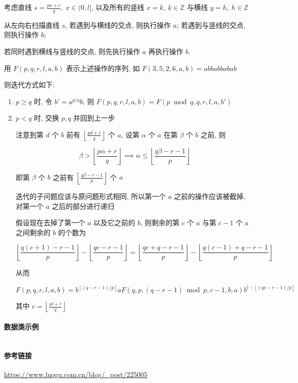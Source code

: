 考虑直线 \(s=\frac{px+r}{q},~x\in (0,l]\), 以及所有的竖线 \(x=k,~k\in\mathbb{Z}\) 与横线 \(y=h,~h\in\mathbb{Z}\)

从左向右扫描直线 \(s\), 若遇到与横线的交点, 则执行操作 \(a\); 若遇到与竖线的交点, 则执行操作 \(b\);

若同时遇到横线与竖线的交点, 则先执行操作 \(a\) 再执行操作 \(b\).

用 \(F(p,q,r,l,a,b)\) 表示上述操作的序列, 如 \(F(3,5,2,6,a,b)=abbabbabab\)

则迭代方式如下:

\begin{enumerate}
    \item \(p\geq q\) 时, 令 \(b'=a^{p/q}b\), 则 \(F(p,q,r,l,a,b)=F(p\bmod q,q,r,l,a,b')\)
    \item \(p<q\) 时, 交换 \(p,q\) 并回到上一步
          
          注意到第 \(d\) 个 \(b\) 前有 \(\left\lfloor\frac{pd+r}{q}\right\rfloor\) 个 \(a\), 设第 \(\alpha\) 个 \(a\) 在第 \(\beta\) 个 \(b\) 之前, 则
          
          \[
              \beta > \left\lfloor\frac{p\alpha+r}{q}\right\rfloor \implies \alpha \leq \left\lfloor\frac{q\beta-r-1}{p}\right\rfloor
          \]
          
          即第 \(\beta\) 个 \(b\) 之前有 \(\left\lfloor\frac{q\beta-r-1}{p}\right\rfloor\) 个 \(a\)
          
          迭代的子问题应该与原问题形式相同, 所以第一个 \(a\) 之前的操作应该被截掉, 对第一个 \(a\) 之后的部分进行递归
          
          假设现在去掉了第一个 \(a\) 以及它之前的 \(b\), 则剩余的第 \(c\) 个 \(a\) 与第 \(c-1\) 个 \(a\) 之间剩余的 \(b\) 的个数为
          
          \[
              \left\lfloor\frac{q(c+1)-r-1}{p}\right\rfloor-\left\lfloor\frac{qc-r-1}{p}\right\rfloor=\left\lfloor\frac{qc+q-r-1}{p}\right\rfloor-\left\lfloor\frac{q(c-1)+q-r-1}{p}\right\rfloor
          \]
          
          从而
          
          \[
              F(p,q,r,l,a,b)=b^{\left\lfloor (q-r-1)/p \right\rfloor}aF(q,p,(q-r-1)\bmod p,c-1,b,a)b^{l-\left\lfloor (qc-r-1)/p \right\rfloor}
          \]
          
          其中 \(c=\left\lfloor\frac{pl+r}{q}\right\rfloor\)
\end{enumerate}

\paragraph{数据类示例}

\inputminted{cpp}{src/src/exeuclid_node.cpp}

\paragraph{参考链接}

\url{https://www.luogu.com.cn/blog/_post/225005}
